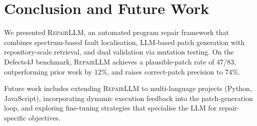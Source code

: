 \section{Conclusion and Future Work}

We presented \textsc{RepairLLM}, an automated program repair framework
that combines spectrum-based fault localisation, LLM-based patch
generation with repository-scale retrieval, and dual validation via
mutation testing. On the Defects4J benchmark, \textsc{RepairLLM} achieves
a plausible-patch rate of 47/83, outperforming prior work by 12\%, and
raises correct-patch precision to 74\%.

Future work includes extending \textsc{RepairLLM} to multi-language
projects (Python, JavaScript), incorporating dynamic execution
feedback into the patch-generation loop, and exploring fine-tuning
strategies that specialise the LLM for repair-specific objectives.

